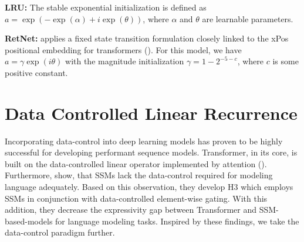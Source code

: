 \documentclass{article} \usepackage{iclr2024_conference,times}
\begin{document}
\textbf{LRU:} The stable exponential initialization is defined as \( a = \exp(-\exp(\alpha) + i\exp(\theta)) \), where \( \alpha \) and \( \theta \) are learnable parameters. 

\textbf{RetNet:} \cite{sun2023retentive} applies a fixed state transition formulation closely linked to the xPos positional embedding for transformers (\cite{sun2022lengthextrapolatable}). For this model, we have \( a = \gamma \exp(i \theta) \) with the magnitude initialization \( \gamma = 1 - 2^{-5-c} \), where \( c \) is some positive constant.

\section{Data Controlled Linear Recurrence}
Incorporating data-control into deep learning models has proven to be highly successful for developing performant sequence models. Transformer, in its core, is built on the data-controlled linear operator implemented by attention (\cite{massaroli2021dissecting}). Furthermore, \cite{fu2023hungry} show, that SSMs lack the data-control required for modeling language adequately. Based on this observation, they develop H3 which employs SSMs in conjunction with data-controlled element-wise gating. With this addition, they decrease the expressivity gap between Transformer and SSM-based-models for language modeling tasks. Inspired by these findings, we take the data-control paradigm further. 
\end{document}
